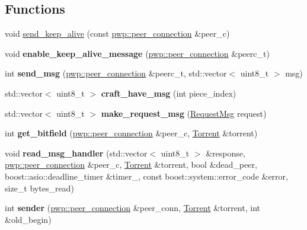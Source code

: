 \subsection*{Functions}
\begin{DoxyCompactItemize}
\item 
void \hyperlink{namespacepwp__msg_a705398f44211d9aa47d9559c5fb405e1}{send\+\_\+keep\+\_\+alive} (const \hyperlink{structpwp_1_1peer__connection}{pwp\+::peer\+\_\+connection} \&peer\+\_\+c)
\item 
\mbox{\label{namespacepwp__msg_acf8c4889b5b58efb38f203afacefa3f6}} 
void {\bfseries enable\+\_\+keep\+\_\+alive\+\_\+message} (\hyperlink{structpwp_1_1peer__connection}{pwp\+::peer\+\_\+connection} \&peerc\+\_\+t)
\item 
\mbox{\label{namespacepwp__msg_a3b2185bbd26718703c13fed900d440f0}} 
int {\bfseries send\+\_\+msg} (\hyperlink{structpwp_1_1peer__connection}{pwp\+::peer\+\_\+connection} \&peerc\+\_\+t, std\+::vector$<$ uint8\+\_\+t $>$ msg)
\item 
\mbox{\label{namespacepwp__msg_a529a3db7938ccfaab85579d58e24061e}} 
std\+::vector$<$ uint8\+\_\+t $>$ {\bfseries craft\+\_\+have\+\_\+msg} (int piece\+\_\+index)
\item 
\mbox{\label{namespacepwp__msg_a2dcbe5fbe0eeca8910340f4978ee4235}} 
std\+::vector$<$ uint8\+\_\+t $>$ {\bfseries make\+\_\+request\+\_\+msg} (\hyperlink{structRequestMsg}{Request\+Msg} request)
\item 
\mbox{\label{namespacepwp__msg_aa9cc2ccac70638ed59075f27f938b8ec}} 
int {\bfseries get\+\_\+bitfield} (\hyperlink{structpwp_1_1peer__connection}{pwp\+::peer\+\_\+connection} \&peer\+\_\+c, \hyperlink{structTorrent}{Torrent} \&torrent)
\item 
\mbox{\label{namespacepwp__msg_aec35de04a2f2d9cb6abdd777917cfaae}} 
void {\bfseries read\+\_\+msg\+\_\+handler} (std\+::vector$<$ uint8\+\_\+t $>$ \&response, \hyperlink{structpwp_1_1peer__connection}{pwp\+::peer\+\_\+connection} \&peer\+\_\+c, \hyperlink{structTorrent}{Torrent} \&torrent, bool \&dead\+\_\+peer, boost\+::asio\+::deadline\+\_\+timer \&timer\+\_\+, const boost\+::system\+::error\+\_\+code \&error, size\+\_\+t bytes\+\_\+read)
\item 
\mbox{\label{namespacepwp__msg_ab578b213d293636d33efc24382f16b25}} 
int {\bfseries sender} (\hyperlink{structpwp_1_1peer__connection}{pwp\+::peer\+\_\+connection} \&peer\+\_\+conn, \hyperlink{structTorrent}{Torrent} \&torrent, int \&old\+\_\+begin)
\end{DoxyCompactItemize}

